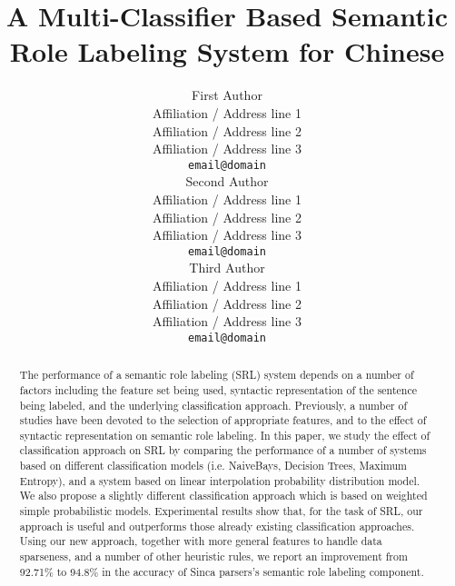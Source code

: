 \documentclass[11pt]{article}
\title{A Multi-Classifier Based Semantic Role Labeling System for Chinese}
\author{First Author \\
  Affiliation / Address line 1 \\
  Affiliation / Address line 2 \\
  Affiliation / Address line 3 \\
  {\tt email@domain} \\\And
  Second Author \\
  Affiliation / Address line 1 \\
  Affiliation / Address line 2 \\
  Affiliation / Address line 3 \\
  {\tt email@domain}  \\\And
  Third Author \\
    Affiliation / Address line 1 \\
    Affiliation / Address line 2 \\
    Affiliation / Address line 3 \\
    {\tt email@domain} \\}
\date{}
\begin{document}
\maketitle
\begin{abstract} 
  The performance of a semantic role labeling (SRL) system depends on a number of factors including the feature set being used, syntactic representation of the sentence being labeled, and the underlying classification approach. Previously, a number of studies have been devoted to the selection of appropriate features, and to the effect of syntactic representation on semantic role labeling. In this paper, we study the effect of classification approach on SRL by comparing the performance of a number of systems based on different classification models (i.e. NaiveBays, Decision Trees, Maximum Entropy), and a system based on linear interpolation probability distribution model. We also propose a slightly different classification approach which is based on weighted simple probabilistic models. Experimental results show that, for the task of SRL, our approach is useful and outperforms those already existing classification approaches. Using our new approach, together with more general features to handle data sparseness, and a number of other heuristic rules, we report an improvement from 92.71\% to 94.8\% in the accuracy of Sinca parsers's semantic role labeling component.      
\end{abstract}
\end{document}
